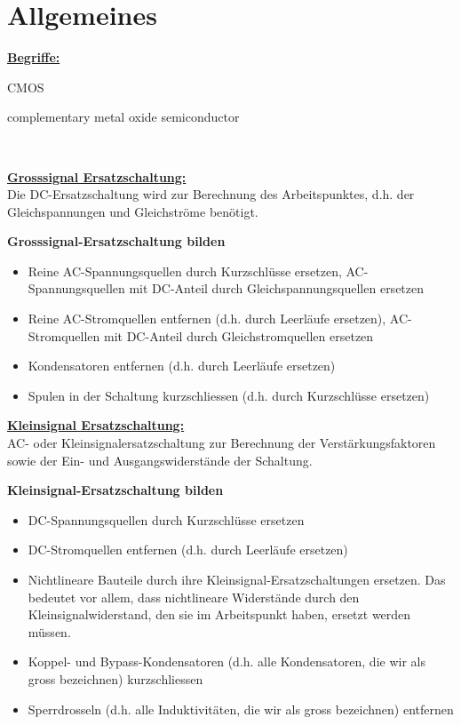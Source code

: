 
\section{Allgemeines}

\uline{\textbf{Begriffe:}}\\
\begin{minipage}[c]{0.1\textwidth}
	CMOS
\end{minipage}
\begin{minipage}[c]{0.8\textwidth}
	complementary metal oxide semiconductor
\end{minipage}\\[2ex]
\begin{minipage}[t]{0.49\textwidth}
	\uline{\textbf{Grosssignal Ersatzschaltung:}}\\
	Die DC-Ersatzschaltung wird zur Berechnung des Arbeitspunktes, d.h. der Gleichspannungen und Gleichströme benötigt.
	
	\textbf{Grosssignal-Ersatzschaltung bilden}
	\begin{itemize}
		\item Reine AC-Spannungsquellen durch Kurzschlüsse ersetzen, AC-Spannungsquellen mit DC-Anteil durch Gleichspannungsquellen ersetzen
		\item Reine AC-Stromquellen entfernen (d.h. durch Leerläufe ersetzen), AC-Stromquellen mit DC-Anteil durch Gleichstromquellen ersetzen
		\item Kondensatoren entfernen (d.h. durch Leerläufe ersetzen)
		\item Spulen in der Schaltung kurzschliessen (d.h. durch Kurzschlüsse ersetzen)
	\end{itemize}
\end{minipage}
\begin{minipage}{0.02\textwidth}
	
\end{minipage}
\begin{minipage}[t]{0.49\textwidth}
	\uline{\textbf{Kleinsignal Ersatzschaltung:}}\\
	AC- oder Kleinsignalersatzschaltung zur Berechnung der Verstärkungsfaktoren sowie der Ein- und Ausgangswiderstände der Schaltung.
	
	\textbf{Kleinsignal-Ersatzschaltung bilden}
	\begin{itemize}
		\item DC-Spannungsquellen durch Kurzschlüsse ersetzen
		\item DC-Stromquellen entfernen (d.h. durch Leerläufe ersetzen)
		\item Nichtlineare Bauteile durch ihre Kleinsignal-Ersatzschaltungen ersetzen. Das bedeutet vor allem, dass nichtlineare Widerstände durch den Kleinsignalwiderstand, den sie im Arbeitspunkt haben, ersetzt werden müssen.
		\item Koppel- und Bypass-Kondensatoren (d.h. alle Kondensatoren, die wir als gross bezeichnen) kurzschliessen
		\item Sperrdrosseln (d.h. alle Induktivitäten, die wir als gross bezeichnen) entfernen
	\end{itemize}
\end{minipage}